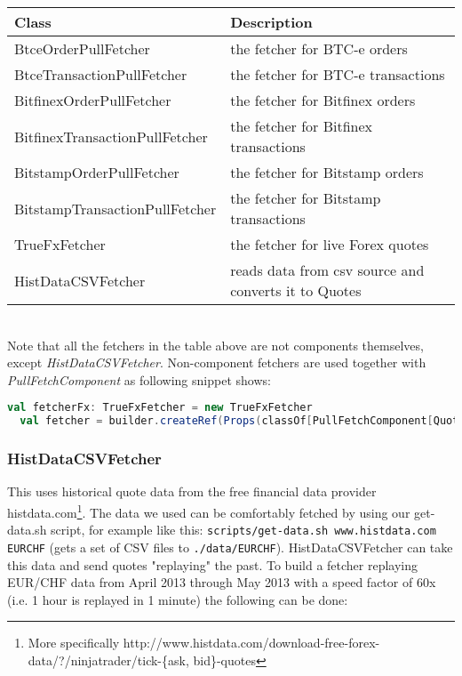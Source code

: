 \noindent
\begin{tabularx}{\textwidth}{|l|X|}
  \hline
  Class & Description  \\
  \hline
  BtceOrderPullFetcher & the fetcher for BTC-e orders \\
  \hline
  BtceTransactionPullFetcher  & the fetcher for BTC-e transactions  \\
  \hline
  BitfinexOrderPullFetcher & the fetcher for Bitfinex orders  \\
  \hline
  BitfinexTransactionPullFetcher & the fetcher for Bitfinex transactions  \\
  \hline
  BitstampOrderPullFetcher & the fetcher for Bitstamp orders  \\
  \hline
  BitstampTransactionPullFetcher & the fetcher for Bitstamp transactions \\
  \hline
  TrueFxFetcher & the fetcher for  live Forex quotes  \\
  \hline
  HistDataCSVFetcher & reads data from csv source and converts it to Quotes \\
  \hline
\end{tabularx}\\[0.3cm]

Note that all the fetchers in the table above are not components themselves, except \emph{HistDataCSVFetcher}. Non-component fetchers are used together with \emph{PullFetchComponent} as following snippet shows:

\begin{lstlisting}[language=Scala]
  val fetcherFx: TrueFxFetcher = new TrueFxFetcher
  val fetcher = builder.createRef(Props(classOf[PullFetchComponent[Quote]], fetcherFx, implicitly[ClassTag[Quote]]), "TrueFxFetcher")
\end{lstlisting}

\subsubsection{HistDataCSVFetcher}

This uses historical quote data from the free financial data provider histdata.com\footnote{More specifically http://www.histdata.com/download-free-forex-data/?/ninjatrader/tick-\{ask, bid\}-quotes}. The data we used can be comfortably fetched by using our get-data.sh script, for example like this: \lstinline|scripts/get-data.sh www.histdata.com EURCHF| (gets a set of CSV files to  \lstinline|./data/EURCHF|). HistDataCSVFetcher can take this data and send quotes "replaying" the past. To build a fetcher replaying EUR/CHF data from April 2013 through May 2013 with a speed factor of 60x (i.e. 1 hour is replayed in 1 minute) the following can be done:

